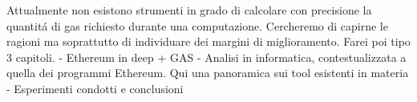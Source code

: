 Attualmente non esistono strumenti in grado di calcolare con precisione la quantitá di gas richiesto durante una computazione. Cercheremo di capirne le ragioni ma soprattutto di individuare dei margini di miglioramento.\newline
\newline
\newline
Farei poi tipo 3 capitoli.\newline
- Ethereum in deep + GAS\newline
- Analisi in informatica, contestualizzata a quella dei programmi Ethereum. Qui una panoramica sui tool esistenti in materia\newline
- Esperimenti condotti e conclusioni\newline
